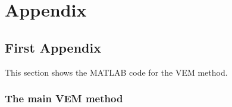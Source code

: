 \chapter{Appendix}

\setcounter{section}{0}                 %
\renewcommand{\thesection}{\Alph{section}} %
\renewcommand{\thesubsection}{\Alph{section}\arabic{subsection}} %
\renewcommand{\thesubsubsection}{\Alph{section}\arabic{subsection}.\arabic{subsubsection}} %


\section{First Appendix}
This section shows the MATLAB code for the VEM method.

\subsection{The main VEM method}

